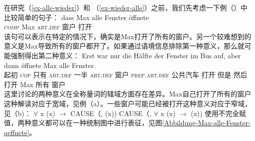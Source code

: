 在研究（\ref{ex-alle-wieder}）和 （\ref{ex-wieder-alle}）之前，我们先考虑一下例（）中比较简单的句子：
\ea
\gll dass Max alle Fenster öffnete\\
	 \textsc{comp} Max \textsc{art}.\textsc{def} 窗户 打开\\
\z
该句可以表示在特定的情况下，确实是Max打开了所有的窗户。另一个较难想到的意义是Max导致所有的窗户都开了。如果通过语境信息排除第一种意义，那么就可能强制得出第二种意义\citep{Egg99a}：
\ea
\gll Erst war nur die Hälfte der Fenster im Bus auf, aber dann öffnete Max alle Fenster.\\
     起初 \textsc{cop} 只有 \textsc{art}.\textsc{def} 一半 \textsc{art}.\textsc{def} 窗户 \textsc{prep}.\textsc{art}.\textsc{def} 公共汽车 打开 但是 然后 打开 Max 所有 窗户\\
\z
这里讨论的两种意义在全称量词的辖域方面存在差异。Max自己打开了所有的窗户这种解读对应于宽域，见例（a）。一些窗户可能已经被打开这种意义对应于窄域，见（b)：
\eal
\ex $\forall$ x (x) $\to$ CAUSE（, (x))
\ex CAUSE（, $\forall$ x (x) $\to$ (x))
\zl
使用不完全赋值，两种意义都可以在一种统制图中进行表征，见图\vref{Abbildung-Max-alle-Fenster-oeffnete}。
